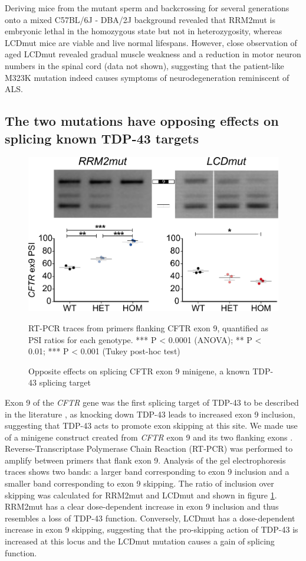 Deriving mice from the mutant sperm and backcrossing for several generations onto a mixed C57BL/6J - DBA/2J background revealed that RRM2mut is embryonic lethal in the homozygous state but not in heterozygosity, whereas LCDmut mice are viable and live normal lifespans. However, close observation of aged LCDmut revealed gradual muscle weakness and a reduction in motor neuron numbers in the spinal cord (data not shown), suggesting that the patient-like M323K mutation indeed causes symptoms of neurodegeneration reminiscent of ALS. 

\subsection{The two mutations have opposing effects on splicing known TDP-43 targets}


\begin{figure}[h!]
	\centering
	\includegraphics[width=12cm]{Figures/05_tdp_mice/CFTR.png}
	\caption{Opposite effects on splicing CFTR exon 9 minigene, a known TDP-43 splicing target}
	RT-PCR traces from primers flanking CFTR exon 9, quantified as PSI ratios for each genotype. *** P < 0.0001 (ANOVA); ** P < 0.01; *** P < 0.001 (Tukey post-hoc test)	
	\label{fig:CFTR}
\end{figure}

Exon 9 of the \textit{CFTR} gene was the first splicing target of TDP-43 to be described in the literature \citep{Buratti2001-et}, as knocking down TDP-43 leads to increased exon 9 inclusion, suggesting that TDP-43 acts to promote exon skipping at this site. We made use of a minigene construct created from \textit{CFTR} exon 9 and its two flanking exons  \citep{Buratti2007minigene}.   Reverse-Transcriptase Polymerase Chain Reaction (RT-PCR) was performed to amplify between primers that flank exon 9. Analysis of the gel electrophoresis traces shows two bands: a larger band corresponding to exon 9 inclusion and a smaller band corresponding to exon 9 skipping. The ratio of inclusion over skipping was calculated for RRM2mut and LCDmut and shown in figure \ref{fig:CFTR}. RRM2mut has a clear dose-dependent increase in exon 9 inclusion and thus resembles a loss of TDP-43 function. Conversely, LCDmut has a dose-dependent increase in exon 9 skipping, suggesting that the pro-skipping action of TDP-43 is increased at this locus and the LCDmut mutation causes a gain of splicing function.


